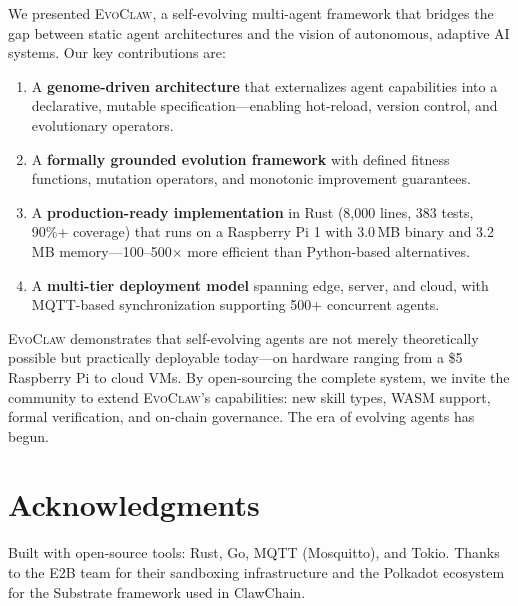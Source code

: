 \documentclass{article}
\newcommand{\evoclaw}{\textsc{EvoClaw}}
\begin{document}
We presented \evoclaw{}, a self-evolving multi-agent framework that bridges the gap between static agent architectures and the vision of autonomous, adaptive AI systems. Our key contributions are:

\begin{enumerate}[leftmargin=*]
    \item A \textbf{genome-driven architecture} that externalizes agent capabilities into a declarative, mutable specification---enabling hot-reload, version control, and evolutionary operators.
    
    \item A \textbf{formally grounded evolution framework} with defined fitness functions, mutation operators, and monotonic improvement guarantees.
    
    \item A \textbf{production-ready implementation} in Rust (8,000 lines, 383 tests, 90\%+ coverage) that runs on a Raspberry Pi 1 with 3.0\,MB binary and 3.2\,MB memory---100--500$\times$ more efficient than Python-based alternatives.
    
    \item A \textbf{multi-tier deployment model} spanning edge, server, and cloud, with MQTT-based synchronization supporting 500+ concurrent agents.
\end{enumerate}

\evoclaw{} demonstrates that self-evolving agents are not merely theoretically possible but practically deployable today---on hardware ranging from a \$5 Raspberry Pi to cloud VMs. By open-sourcing the complete system, we invite the community to extend \evoclaw{}'s capabilities: new skill types, WASM support, formal verification, and on-chain governance. The era of evolving agents has begun.



\section*{Acknowledgments}

Built with open-source tools: Rust, Go, MQTT (Mosquitto), and Tokio. Thanks to the E2B team for their sandboxing infrastructure and the Polkadot ecosystem for the Substrate framework used in ClawChain.


\end{document}
